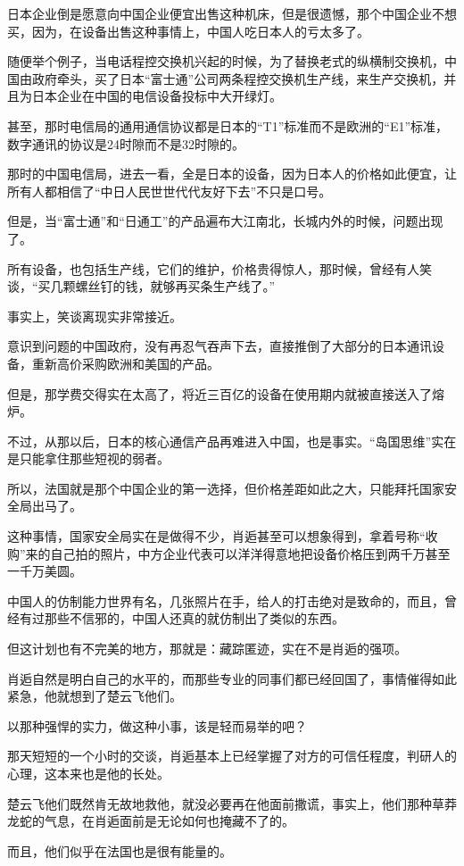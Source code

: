 日本企业倒是愿意向中国企业便宜出售这种机床，但是很遗憾，那个中国企业不想买，因为，在设备出售这种事情上，中国人吃日本人的亏太多了。

随便举个例子，当电话程控交换机兴起的时候，为了替换老式的纵横制交换机，中国由政府牵头，买了日本“富士通”公司两条程控交换机生产线，来生产交换机，并且为日本企业在中国的电信设备投标中大开绿灯。

甚至，那时电信局的通用通信协议都是日本的“T1”标准而不是欧洲的“E1”标准，数字通讯的协议是24时隙而不是32时隙的。

那时的中国电信局，进去一看，全是日本的设备，因为日本人的价格如此便宜，让所有人都相信了“中日人民世世代代友好下去”不只是口号。

但是，当“富士通”和“日通工”的产品遍布大江南北，长城内外的时候，问题出现了。

所有设备，也包括生产线，它们的维护，价格贵得惊人，那时候，曾经有人笑谈，“买几颗螺丝钉的钱，就够再买条生产线了。”

事实上，笑谈离现实非常接近。

意识到问题的中国政府，没有再忍气吞声下去，直接推倒了大部分的日本通讯设备，重新高价采购欧洲和美国的产品。

但是，那学费交得实在太高了，将近三百亿的设备在使用期内就被直接送入了熔炉。

不过，从那以后，日本的核心通信产品再难进入中国，也是事实。“岛国思维”实在是只能拿住那些短视的弱者。

所以，法国就是那个中国企业的第一选择，但价格差距如此之大，只能拜托国家安全局出马了。

这种事情，国家安全局实在是做得不少，肖逅甚至可以想象得到，拿着号称“收购”来的自己拍的照片，中方企业代表可以洋洋得意地把设备价格压到两千万甚至一千万美圆。

中国人的仿制能力世界有名，几张照片在手，给人的打击绝对是致命的，而且，曾经有过那些不信邪的，中国人还真的就仿制出了类似的东西。

但这计划也有不完美的地方，那就是：藏踪匿迹，实在不是肖逅的强项。

肖逅自然是明白自己的水平的，而那些专业的同事们都已经回国了，事情催得如此紧急，他就想到了楚云飞他们。

以那种强悍的实力，做这种小事，该是轻而易举的吧？

那天短短的一个小时的交谈，肖逅基本上已经掌握了对方的可信任程度，判研人的心理，这本来也是他的长处。

楚云飞他们既然肯无故地救他，就没必要再在他面前撒谎，事实上，他们那种草莽龙蛇的气息，在肖逅面前是无论如何也掩藏不了的。

而且，他们似乎在法国也是很有能量的。

